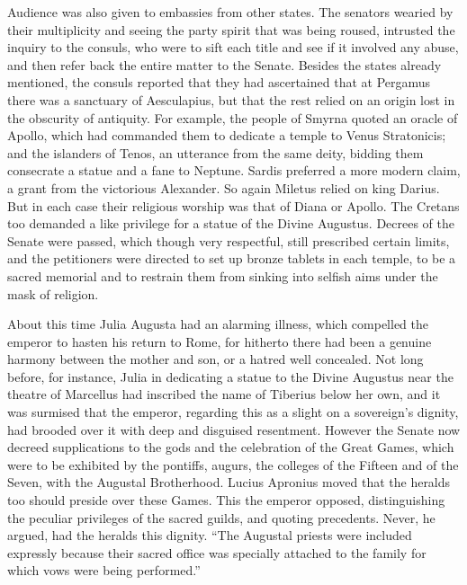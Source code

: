 Audience was also given to embassies from other states. The senators wearied by their multiplicity and seeing the party spirit that was being roused, intrusted the inquiry to the consuls, who were to sift each title and see if it involved any abuse, and then refer back the entire matter to the Senate. Besides the states already mentioned, the consuls reported that they had ascertained that at Pergamus there was a sanctuary of Aesculapius, but that the rest relied on an origin lost in the obscurity of antiquity. For example, the people of Smyrna quoted an oracle of Apollo, which had commanded them to dedicate a temple to Venus Stratonicis; and the islanders of Tenos, an utterance from the same deity, bidding them consecrate a statue and a fane to Neptune. Sardis preferred a more modern claim, a grant from the victorious Alexander. So again Miletus relied on king Darius. But in each case their religious worship was that of Diana or Apollo. The Cretans too demanded a like privilege for a statue of the Divine Augustus. Decrees of the Senate were passed, which though very respectful, still prescribed certain limits, and the petitioners were directed to set up bronze tablets in each temple, to be a sacred memorial and to restrain them from sinking into selfish aims under the mask of religion.


About this time Julia Augusta had an alarming illness, which compelled the emperor to hasten his return to Rome, for hitherto there had been a genuine harmony between the mother and son, or a hatred well concealed. Not long before, for instance, Julia in dedicating a statue to the Divine Augustus near the theatre of Marcellus had inscribed the name of Tiberius below her own, and it was surmised that the emperor, regarding this as a slight on a sovereign's dignity, had brooded over it with deep and disguised resentment. However the Senate now decreed supplications to the gods and the celebration of the Great Games, which were to be exhibited by the pontiffs, augurs, the colleges of the Fifteen and of the Seven, with the Augustal Brotherhood. Lucius Apronius moved that the heralds too should preside over these Games. This the emperor opposed, distinguishing the peculiar privileges of the sacred guilds, and quoting precedents. Never, he argued, had the heralds this dignity. ``The Augustal priests were included expressly because their sacred office was specially attached to the family for which vows were being performed.''


